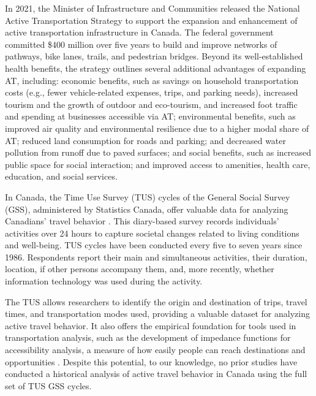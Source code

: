 \documentclass[preprint, 3p,
authoryear]{elsarticle} %
\begin{document}
In 2021, the Minister of Infrastructure and Communities released the
National Active Transportation Strategy \citep{canada2021} to support
the expansion and enhancement of active transportation infrastructure in
Canada. The federal government committed \$400 million over five years
to build and improve networks of pathways, bike lanes, trails, and
pedestrian bridges. Beyond its well-established health benefits, the
strategy outlines several additional advantages of expanding AT,
including: economic benefits, such as savings on household
transportation costs (e.g., fewer vehicle-related expenses, trips, and
parking needs), increased tourism and the growth of outdoor and
eco-tourism, and increased foot traffic and spending at businesses
accessible via AT; environmental benefits, such as improved air quality
and environmental resilience due to a higher modal share of AT; reduced
land consumption for roads and parking; and decreased water pollution
from runoff due to paved surfaces; and social benefits, such as
increased public space for social interaction; and improved access to
amenities, health care, education, and social services.

In Canada, the Time Use Survey (TUS) cycles of the General Social Survey
(GSS), administered by Statistics Canada, offer valuable data for
analyzing Canadians' travel behavior \citep{statisticscanada2022}. This
diary-based survey records individuals' activities over 24 hours to
capture societal changes related to living conditions and well-being.
TUS cycles have been conducted every five to seven years since 1986.
Respondents report their main and simultaneous activities, their
duration, location, if other persons accompany them, and, more recently,
whether information technology was used during the activity.

The TUS allows researchers to identify the origin and destination of
trips, travel times, and transportation modes used, providing a valuable
dataset for analyzing active travel behavior. It also offers the
empirical foundation for tools used in transportation analysis, such as
the development of impedance functions for accessibility analysis, a
measure of how easily people can reach destinations and opportunities
\citep{hansen1959, paez2012}. Despite this potential, to our knowledge,
no prior studies have conducted a historical analysis of active travel
behavior in Canada using the full set of TUS GSS cycles.
\end{document}
